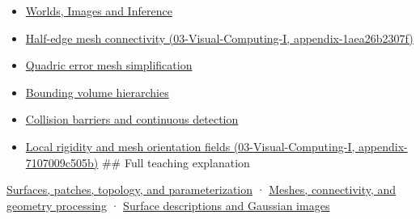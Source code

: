 \begin{itemize}
\item
  \href{Continuous\%20Notes/University\%20-\%20Worlds,\%20Images\%20and\%20Inference\%20-\%20Graphics,\%20Vision\%20and\%20Photography}{Worlds, Images and Inference}
\item
  \href{../03-Visual-Computing-I/main.pdf\#nameddest=appendix-1aea26b2307f}{Half-edge mesh connectivity (03-Visual-Computing-I, appendix-1aea26b2307f)}
\item
  \hyperref[appendix-1dd4ad54ca57]{Quadric error mesh simplification}
\item
  \hyperref[appendix-0b426c47dd78]{Bounding volume hierarchies}
\item
  \hyperref[appendix-a9ba01fa72a6]{Collision barriers and continuous detection}
\item
  \href{../03-Visual-Computing-I/main.pdf\#nameddest=appendix-7107009c505b}{Local rigidity and mesh orientation fields (03-Visual-Computing-I, appendix-7107009c505b)} \#\# Full teaching explanation
\end{itemize}

\href{Continuous\%20Notes/University\%20-\%20Worlds,\%20Images\%20and\%20Inference\%20-\%20Graphics,\%20Vision\%20and\%20Photography\#Surfaces,\%20patches,\%20topology,\%20and\%20parameterization}{Surfaces, patches, topology, and parameterization} · \href{Continuous\%20Notes/University\%20-\%20Worlds,\%20Images\%20and\%20Inference\%20-\%20Graphics,\%20Vision\%20and\%20Photography\#Meshes,\%20connectivity,\%20and\%20geometry\%20processing}{Meshes, connectivity, and geometry processing} · \href{Continuous\%20Notes/University\%20-\%20Worlds,\%20Images\%20and\%20Inference\%20-\%20Graphics,\%20Vision\%20and\%20Photography\#Surface\%20descriptions\%20and\%20Gaussian\%20images}{Surface descriptions and Gaussian images}
